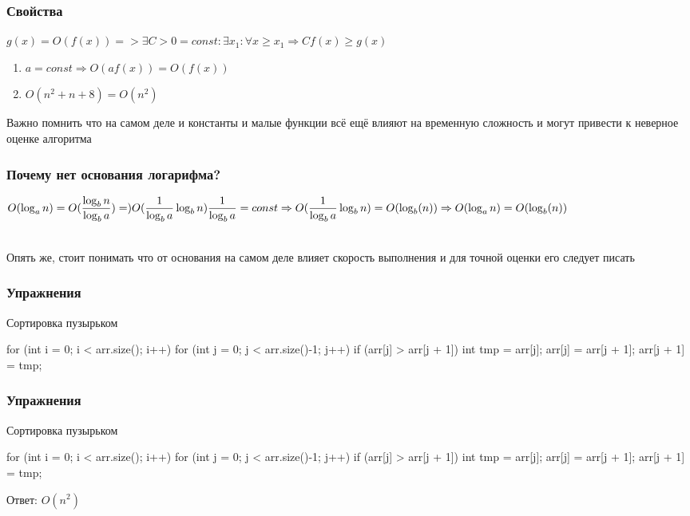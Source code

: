 \begin{frame}
    \frametitle{Свойства}

    \quad $g(x) = O(f(x)) => \exists C > 0 = const : \exists x_1:  \forall x\geq x_1 \Rightarrow Cf(x) \geq g(x)$ 

    \begin{enumerate}
        \item $a=const \Rightarrow O(af(x))=O(f(x))$
        \item $O(n^2+n+8)=O(n^2)$\\
    \end{enumerate}

     \quad Важно помнить что на самом деле и константы и малые функции всё ещё влияют на временную сложность и могут привести к неверное оценке алгоритма 
\end{frame}


\begin{frame}
    \frametitle{Почему нет основания логарифма?}
    \quad $O(\log_a{n})=O(\dfrac{\log_b{n}}{\log_b{a}})=)O(\dfrac{1}{\log_b{a}}\log_b{n})\\ \dfrac{1}{\log_b{a}}=const \Rightarrow O(\dfrac{1}{\log_b{a}}\log_b{n})=O(\log_b(n))\Rightarrow O(\log_a{n}) = O(\log_b(n))$

\\
    \quad Опять же, стоит понимать что от основания на самом деле влияет скорость выполнения и для точной оценки его следует писать
\end{frame}


\begin{frame}[fragile]
    \frametitle{Упражнения}
    
    Сортировка пузырьком
    \begin{cpp}
        for (int i = 0; i < arr.size(); i++) {
            for (int j = 0; j < arr.size()-1; j++) {
                if (arr[j] > arr[j + 1]) {
                    int tmp = arr[j];
                    arr[j] = arr[j + 1];
                    arr[j + 1] = tmp;
                }
            }
        }
    \end{cpp}
    
\end{frame}


\begin{frame}[fragile]
    \frametitle{Упражнения}
    
    Сортировка пузырьком
    \begin{cpp}
        for (int i = 0; i < arr.size(); i++) {
            for (int j = 0; j < arr.size()-1; j++) {
                if (arr[j] > arr[j + 1]) {
                    int tmp = arr[j];
                    arr[j] = arr[j + 1];
                    arr[j + 1] = tmp;
                }
            }
        }
    \end{cpp}

    Ответ: $O(n^2)$

\end{frame}

